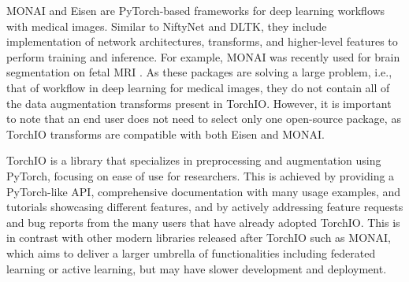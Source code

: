 \ac{MONAI} \cite{cardoso_monai_2022} and Eisen \cite{mancolo_eisen_2020} are PyTorch-based frameworks for deep learning workflows with medical images.
Similar to NiftyNet and \ac{DLTK}, they include implementation of network architectures, transforms, and higher-level features to perform training and inference.
For example, \ac{MONAI} was recently used for brain segmentation on fetal \ac{MRI} \cite{ranzini_monaifbs_2021}.
As these packages are solving a large problem, i.e., that of workflow in deep learning for medical images, they do not contain all of the data augmentation transforms present in TorchIO.
However, it is important to note that an end user does not need to select only one open-source package, as TorchIO transforms are compatible with both Eisen and \ac{MONAI}.

TorchIO is a library that specializes in preprocessing and augmentation using PyTorch, focusing on ease of use for researchers.
This is achieved by providing a PyTorch-like \ac{API}, comprehensive documentation with many usage examples, and tutorials showcasing different features, and by actively addressing feature requests and bug reports from the many users that have already adopted TorchIO.
This is in contrast with other modern libraries released after TorchIO such as \ac{MONAI}, which aims to deliver a larger umbrella of functionalities including federated learning or active learning, but may have slower development and deployment.
